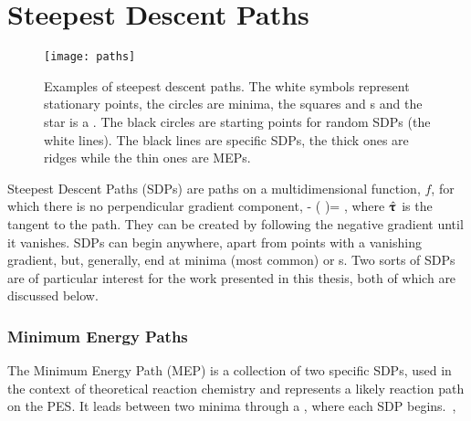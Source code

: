 \section{Steepest Descent Paths}
\label{sec:sdps}

\begin{figure}[h]
  \begin{center}
    \texttt{[image: paths]}
    \parbox{0.85\linewidth}{
      \caption{Examples of steepest descent paths.
The white symbols represent stationary points, the circles are minima, the squares and s and the star is a .
The black circles are starting points for random SDPs (the white lines).
The black lines are specific SDPs, the thick ones are ridges while the thin ones are MEPs.
      }
      \label{fig:paths}
    }
  \end{center}
\end{figure}

Steepest Descent Paths (SDPs) are paths on a multidimensional function, $f$, for which there is no perpendicular gradient component,
\nabla {} - (\nabla {} \cdot \uvt)\uvt = ,
\eeq
where $\hat{{\mathrm{\mathbf{\bm{\uptau}}}}}$ is the tangent to the path.
They can be created by following the negative gradient until it vanishes.
SDPs can begin anywhere, apart from points with a vanishing gradient, but, generally, end at minima (most common) or \sap{}s.
Two sorts of SDPs are of particular interest for the work presented in this thesis, both of which are discussed below.


\subsubsection{Minimum Energy Paths}


The Minimum Energy Path (MEP) is a collection of two specific SDPs, used in the context of theoretical reaction chemistry and represents a likely reaction path on the PES.
It leads between two minima through a , where each SDP begins.~\cite{neb-polemic-henkelman1},

